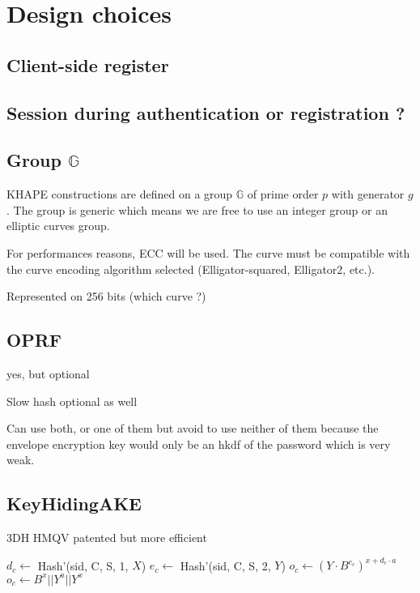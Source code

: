 \documentclass[../report.tex]{subfiles}
\begin{document}
\section{Design choices}

\subsection{Client-side register}

\subsection{Session during authentication or registration ?}

\subsection{Group $\mathbb{G}$}


KHAPE constructions are defined on a group $\mathbb{G}$ of prime order $p$ with generator $g$.
The group is generic which means we are free to use an integer group or an elliptic curves group.

For performances reasons, ECC will be used.
The curve must be compatible with the curve encoding algorithm selected (Elligator-squared, Elligator2, etc.).

Represented on 256 bits (which curve ?)


\subsection{OPRF}
yes, but optional

Slow hash optional as well

Can use both, or one of them but avoid to use neither of them because the envelope encryption key would only be an hkdf of the password which is very weak.

\subsection{KeyHidingAKE}
3DH
HMQV patented but more efficient

\begin{algorithmic}
\State $d_c \gets$ Hash'(sid, C, S, 1, $X$)
\State $e_c \gets$ Hash'(sid, C, S, 2, $Y$)
\State $o_c \gets (Y \cdot B^{e_c})^{x+d_c \cdot a}$
\State
\State $o_c \gets B^x || Y^a || Y^x$
\end{algorithmic}
\end{document}
